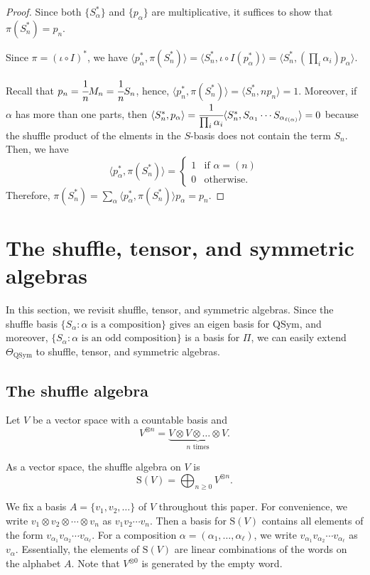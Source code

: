 \documentclass[12pt]{amsart}
\numberwithin{equation}{section}
\newcommand{\QSym}{\mathrm{QSym}}
\newcommand{\rmS}{\mathrm{S}}
\begin{document}
\begin{proof}
	Since both $\{S_\alpha^*\}$ and $\{p_\alpha\}$ are multiplicative, it suffices to show that $\pi(S_n^*)=p_n$.
	
	Since $\pi=(\iota\circ I)^*$, we have $\langle p_\alpha^*,\pi(S_n^*)\rangle=\langle S_n^*,\iota\circ I(p_\alpha^*)\rangle=\langle S_n^*,(\prod_i\alpha_i)p_\alpha \rangle$.
	
	Recall that $p_n=\cfrac{1}{n}M_n=\cfrac{1}{n}S_n$, hence, $\langle p_n^*,\pi(S_n^*)\rangle =\langle S_n^*,np_n\rangle=1$. Moreover, if $\alpha$ has more than one parts, then $\langle S_n^*, p_\alpha\rangle=\cfrac{1}{\prod_i\alpha_i}\langle S_n^*,S_{\alpha_1}\cdots S_{\alpha_{\ell(\alpha)}}\rangle=0$ because the shuffle product of the elments in the $S$-basis does not contain the term $S_n$. Then, we have
	$$\langle p_\alpha^*,\pi(S_n^*)\rangle=\left\{\begin{array}{cc}
		1 & \text{if }\alpha=(n)\\
		0 & \text{otherwise}.
	\end{array}\right.$$
	Therefore, $\pi(S_n^*)=\displaystyle\sum_\alpha\langle p_\alpha^*,\pi(S_n^*)\rangle p_\alpha=p_n$.
\end{proof}


\section{The shuffle, tensor, and symmetric algebras}\label{sec:Hopfs}

In this section, we revisit shuffle, tensor, and symmetric algebras. Since the shuffle basis $\{S_\alpha: \alpha \text{~is a composition}\}$  gives an eigen basis for $\QSym$, and moreover, $\{S_\alpha: \alpha \text{~is an odd composition}\}$ is a basis for $\Pi$, we can easily extend $\Theta_\QSym$ to shuffle, tensor, and symmetric algebras.  

\subsection{The shuffle algebra}

Let $V$ be a vector space with a countable basis and
$$V^{\otimes n}=\underbrace{V\otimes V \otimes \dots \otimes V}_{\text{$n$ times}}.$$

As a vector space, the shuffle algebra on $V$ is
$$\rmS(V)=\bigoplus_{n\geq 0}V^{\otimes n}.$$

We fix a basis $A=\{v_1,v_2,\dots\}$ of $V$ throughout this paper. For convenience, we write $v_1\otimes v_2\otimes \cdots \otimes v_n$ as $v_1v_2\cdots v_n$. 
Then a basis for $\rmS(V)$ contains all elements of the form $v_{\alpha_1}v_{\alpha_2}\cdots v_{\alpha_\ell}$. For a composition $\alpha=(\alpha_1,\dots,\alpha_\ell)$, we write $v_{\alpha_1}v_{\alpha_2}\cdots v_{\alpha_\ell}$ as $v_\alpha$. Essentially, the elements of $\rmS(V)$ are linear combinations of the words on the alphabet $A$. Note that $V^{\otimes 0}$ is generated by the empty word.
\end{document}
